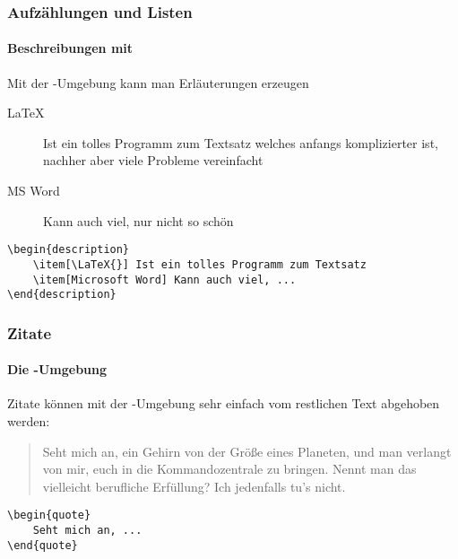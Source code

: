 \begin{frame}[fragile]
    \frametitle{Aufzählungen und Listen}
    \framesubtitle{Beschreibungen mit }
    
    Mit der -Umgebung kann man Erläuterungen erzeugen
    \medskip
    \begin{description}
        \item[\LaTeX{}] Ist ein tolles Programm zum Textsatz welches anfangs komplizierter ist, nachher aber viele Probleme vereinfacht
        \item[MS Word] Kann auch viel, nur nicht so schön
    \end{description}
    
    \bigskip\pause
\begin{codeblock}
\begin{verbatim}
\begin{description}
    \item[\LaTeX{}] Ist ein tolles Programm zum Textsatz
    \item[Microsoft Word] Kann auch viel, ...
\end{description}
\end{verbatim}
\end{codeblock}
\end{frame}


\begin{frame}[fragile]
    \frametitle{Zitate}
    \framesubtitle{Die -Umgebung}
    
    Zitate können mit der -Umgebung sehr einfach vom restlichen Text abgehoben werden:
    \begin{quote}
        Seht mich an, ein Gehirn von der Größe eines Planeten, und man verlangt von mir,
        euch in die Kommandozentrale zu bringen. Nennt man das vielleicht berufliche
        Erfüllung? Ich jedenfalls tu's nicht.
    \end{quote}
    
    \bigskip\pause
    \begin{codeblock}
\begin{verbatim}
\begin{quote}
    Seht mich an, ...
\end{quote}
\end{verbatim}
    \end{codeblock}
\end{frame}


